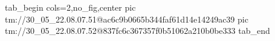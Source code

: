  
 
 
 
 

\qqSecOrig


\ifcmt
  tab_begin cols=2,no_fig,center
    pic tm://30_05_22.08.07.51@ac6c9b0665b344faf61d14e14249ac39
    pic tm://30_05_22.08.07.52@837fc6c367357f0b51062a210b0be333
  tab_end
\fi

